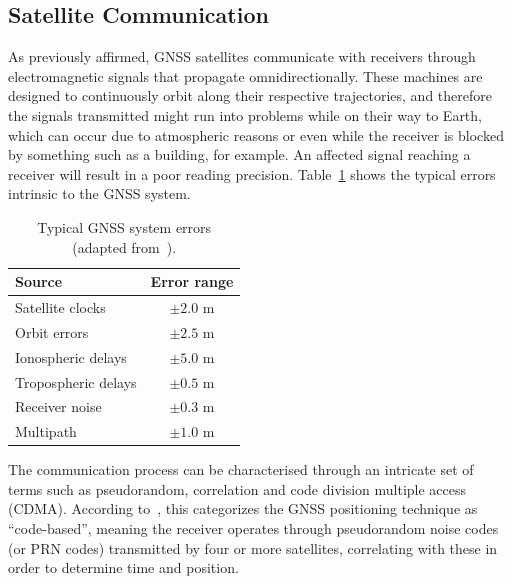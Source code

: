 \subsection{Satellite Communication}\label{sec:II_gnss_comm}

As previously affirmed, GNSS satellites communicate with receivers through electromagnetic signals that propagate omnidirectionally. These machines are designed to continuously orbit along their respective trajectories, and therefore the signals transmitted might run into problems while on their way to Earth, which can occur due to atmospheric reasons or even while the receiver is blocked by something such as a building, for example. An affected signal reaching a receiver will result in a poor reading precision. Table~\ref{tab:GNSS_sys_errors} shows the typical errors intrinsic to the GNSS system.

\begingroup
\begin{table}[h]
	\caption{Typical GNSS system errors (adapted from~\cite{novatel_gnss}).}
	\label{tab:GNSS_sys_errors}
	\centering%
	\begin{tabular}{lc}
        \toprule
        \textbf{Source} & \textbf{Error range} \\
        \midrule
        Satellite clocks & $\pm 2.0$ m \\
        \midrule
        Orbit errors & $\pm 2.5$ m \\
        \midrule
        Ionospheric delays & $\pm 5.0$ m \\
        \midrule
        Tropospheric delays & $\pm 0.5$ m \\
        \midrule
        Receiver noise & $\pm 0.3$ m \\
        \midrule
        Multipath & $\pm 1.0$ m \\
        \bottomrule
    \end{tabular}
\end{table}
\endgroup

The communication process can be characterised through an intricate set of terms such as \gls{pseudorandom}, \gls{correlation} and code division multiple access (CDMA). According to~\cite{novatel_gnss}, this categorizes the GNSS positioning technique as ``code-based'', meaning the receiver operates through pseudorandom noise codes (or PRN codes) transmitted by four or more satellites, correlating with these in order to determine time and position.

